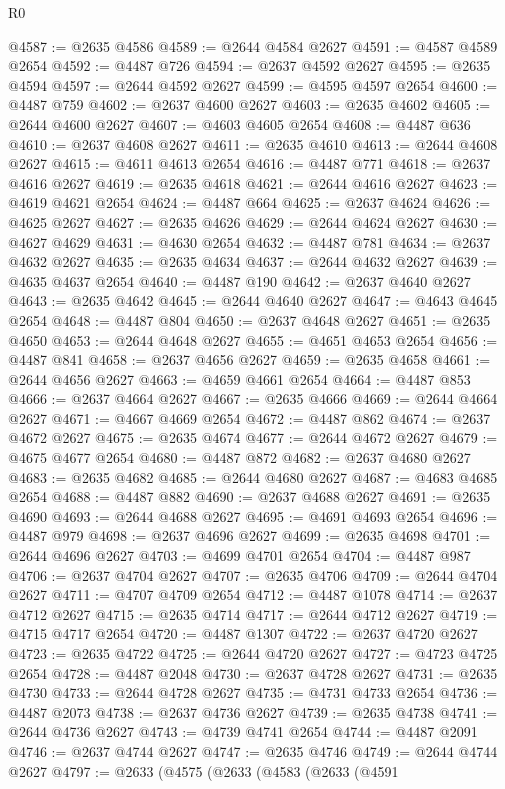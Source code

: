 \begin{lexlean}{R0}
\begin{coremodule}
@4587 := @2635 @4586
@4589 := @2644 @4584 @2627
@4591 := @4587 @4589 @2654
@4592 := @4487 @726
@4594 := @2637 @4592 @2627
@4595 := @2635 @4594
@4597 := @2644 @4592 @2627
@4599 := @4595 @4597 @2654
@4600 := @4487 @759
@4602 := @2637 @4600 @2627
@4603 := @2635 @4602
@4605 := @2644 @4600 @2627
@4607 := @4603 @4605 @2654
@4608 := @4487 @636
@4610 := @2637 @4608 @2627
@4611 := @2635 @4610
@4613 := @2644 @4608 @2627
@4615 := @4611 @4613 @2654
@4616 := @4487 @771
@4618 := @2637 @4616 @2627
@4619 := @2635 @4618
@4621 := @2644 @4616 @2627
@4623 := @4619 @4621 @2654
@4624 := @4487 @664
@4625 := @2637 @4624
@4626 := @4625 @2627
@4627 := @2635 @4626
@4629 := @2644 @4624 @2627
@4630 := @4627 @4629
@4631 := @4630 @2654
@4632 := @4487 @781
@4634 := @2637 @4632 @2627
@4635 := @2635 @4634
@4637 := @2644 @4632 @2627
@4639 := @4635 @4637 @2654
@4640 := @4487 @190
@4642 := @2637 @4640 @2627
@4643 := @2635 @4642
@4645 := @2644 @4640 @2627
@4647 := @4643 @4645 @2654
@4648 := @4487 @804
@4650 := @2637 @4648 @2627
@4651 := @2635 @4650
@4653 := @2644 @4648 @2627
@4655 := @4651 @4653 @2654
@4656 := @4487 @841
@4658 := @2637 @4656 @2627
@4659 := @2635 @4658
@4661 := @2644 @4656 @2627
@4663 := @4659 @4661 @2654
@4664 := @4487 @853
@4666 := @2637 @4664 @2627
@4667 := @2635 @4666
@4669 := @2644 @4664 @2627
@4671 := @4667 @4669 @2654
@4672 := @4487 @862
@4674 := @2637 @4672 @2627
@4675 := @2635 @4674
@4677 := @2644 @4672 @2627
@4679 := @4675 @4677 @2654
@4680 := @4487 @872
@4682 := @2637 @4680 @2627
@4683 := @2635 @4682
@4685 := @2644 @4680 @2627
@4687 := @4683 @4685 @2654
@4688 := @4487 @882
@4690 := @2637 @4688 @2627
@4691 := @2635 @4690
@4693 := @2644 @4688 @2627
@4695 := @4691 @4693 @2654
@4696 := @4487 @979
@4698 := @2637 @4696 @2627
@4699 := @2635 @4698
@4701 := @2644 @4696 @2627
@4703 := @4699 @4701 @2654
@4704 := @4487 @987
@4706 := @2637 @4704 @2627
@4707 := @2635 @4706
@4709 := @2644 @4704 @2627
@4711 := @4707 @4709 @2654
@4712 := @4487 @1078
@4714 := @2637 @4712 @2627
@4715 := @2635 @4714
@4717 := @2644 @4712 @2627
@4719 := @4715 @4717 @2654
@4720 := @4487 @1307
@4722 := @2637 @4720 @2627
@4723 := @2635 @4722
@4725 := @2644 @4720 @2627
@4727 := @4723 @4725 @2654
@4728 := @4487 @2048
@4730 := @2637 @4728 @2627
@4731 := @2635 @4730
@4733 := @2644 @4728 @2627
@4735 := @4731 @4733 @2654
@4736 := @4487 @2073
@4738 := @2637 @4736 @2627
@4739 := @2635 @4738
@4741 := @2644 @4736 @2627
@4743 := @4739 @4741 @2654
@4744 := @4487 @2091
@4746 := @2637 @4744 @2627
@4747 := @2635 @4746
@4749 := @2644 @4744 @2627
@4797 := @2633
    (@4575
      (@2633
        (@4583
          (@2633
            (@4591

\end{coremodule}
\end{lexlean}
